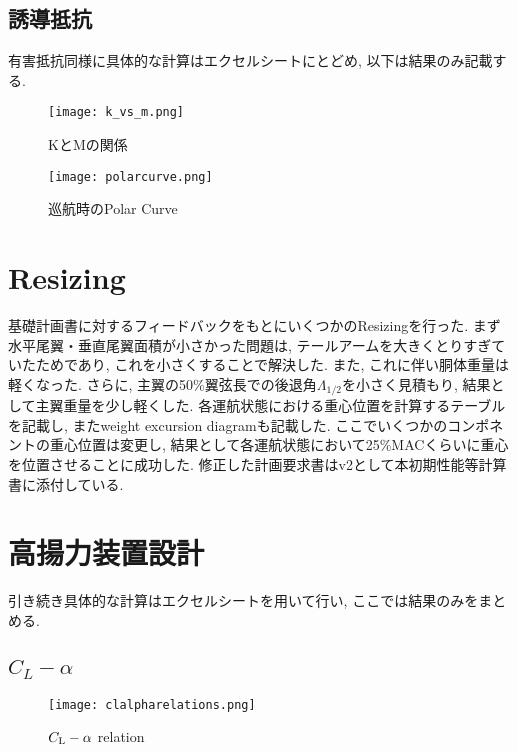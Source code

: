 \documentclass[12pt]{jsarticle}
\begin{document}
\subsection{誘導抵抗}
有害抵抗同様に具体的な計算はエクセルシートにとどめ, 以下は結果のみ記載する.
\begin{figure}[H]
 \begin{minipage}{0.5\hsize}
  \begin{center}
   \texttt{[image: k\_vs\_m.png]}
  \end{center}
  \caption{KとMの関係}
  \label{fig:one}
 \end{minipage}
 \begin{minipage}{0.5\hsize}
  \begin{center}
   \texttt{[image: polarcurve.png]}
  \end{center}
  \caption{巡航時のPolar Curve}
  \label{fig:two}
 \end{minipage}
\end{figure}

\section{Resizing}
基礎計画書に対するフィードバックをもとにいくつかのResizingを行った. まず水平尾翼・垂直尾翼面積が小さかった問題は, テールアームを大きくとりすぎていたためであり, これを小さくすることで解決した. また, これに伴い胴体重量は軽くなった. さらに, 主翼の50\%翼弦長での後退角$\Lambda_{1/2}$を小さく見積もり, 結果として主翼重量を少し軽くした. 各運航状態における重心位置を計算するテーブルを記載し, またweight excursion diagramも記載した. ここでいくつかのコンポネントの重心位置は変更し, 結果として各運航状態において25\%MACくらいに重心を位置させることに成功した. 修正した計画要求書はv2として本初期性能等計算書に添付している.

\section{高揚力装置設計}
引き続き具体的な計算はエクセルシートを用いて行い, ここでは結果のみをまとめる.
\subsection{$C_{L}-\alpha$}
\begin{figure}[H]
\begin{center}
\texttt{[image: clalpharelations.png]}
\caption{$C_{\rm L}-\alpha$ relation}
\end{center}
\end{figure}
\end{document}
